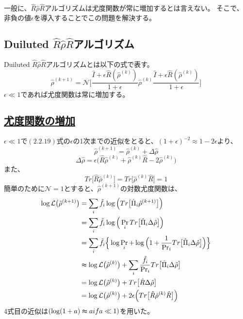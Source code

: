 \documentclass[11pt,a4j,notitlepage]{jreport}
\begin{document}
	一般に、$\hat{R} \hat{\rho} \hat{R}$アルゴリズムは尤度関数が常に増加するとは言えない。
	そこで、非負の値$\epsilon$を導入することでこの問題を解決する。

	\subsection{Duiluted $\hat{R} \hat{\rho} \hat{R}$アルゴリズム}

	Duiluted $\hat{R} \hat{\rho} \hat{R}$アルゴリズムとは以下の式で表す。
	\begin{equation}
		\hat{\rho}^{(k+1)} = \mathcal{N} \Bigg[ \frac{\hat{I} + \epsilon \hat{R} (\hat{\rho}^{(k)})}{1+\epsilon} \hat{\rho}^{(k)} \frac{\hat{I} + \epsilon \hat{R} (\hat{\rho}^{(k)})}{1+\epsilon} \Bigg]
	\end{equation}
	$\epsilon \ll 1$であれば尤度関数は常に増加する。

	\subsection*{\underline{尤度関数の増加}}

	$\epsilon \ll 1$で$(2.2.19)$式の$\epsilon$の1次までの近似をとると、$(1 + \epsilon)^{-2} \approx 1 - 2\epsilon$より、
	\begin{equation}
		\hat{\rho}^{(k+1)} = \hat{\rho}^{(k)} + \Delta \hat{\rho}
	\end{equation}
	\begin{equation}
		\Delta \hat{\rho} = \epsilon \big( \hat{R} \hat{\rho}^{(k)} + \hat{\rho}^{(k)} \hat{R} -2 \hat{\rho}^{(k)} \big)
	\end{equation}
	また、
	\begin{equation}
		Tr \big[ \hat{R} \hat{\rho}^{(k)} \big] = Tr \big[ \hat{\rho}^{(k)} \hat{R} \big] = 1 
	\end{equation}
	簡単のために$\mathcal{N} = 1$とすると、$\hat{\rho}^{(k+1)}$の対数尤度関数は、
	\begin{equation}
		\begin{aligned}
			\log \mathcal{L} \big( \hat{\rho}^{(k+1)} \big) &= \sum_i \tilde{f}_i \log \Big( Tr \big[ \hat{\Pi}_i \hat{\rho}^{(k+1)} \big] \Big) \\
			&= \sum_i \tilde{f}_i \log \Big( \Pr_i Tr \big[ \hat{\Pi}_i \Delta \hat{\rho} \big] \Big) \\
			&= \sum_i \tilde{f}_i \Big\{ \log \Pr_i + \log \Big( 1 + \frac{1}{\Pr_i} Tr \big[ \hat{\Pi}_i \Delta \hat{\rho} \big] \Big) \Big\} \\
			&\thickapprox \log \mathcal{L} \big( \hat{\rho}^{(k)} \big) + \sum_i \frac{\tilde{f}_i}{\Pr_i} Tr \big[ \hat{\Pi}_i \Delta \hat{\rho} \big] \\
			&= \log \mathcal{L} \big( \hat{\rho}^{(k)} \big) + Tr \big[ \hat{R} \Delta \hat{\rho} \big] \\
			&= \log \mathcal{L} \big( \hat{\rho}^{(k)} \big) + 2 \epsilon \Big( Tr \big[ \hat{R} \hat{\rho}^{(k)} \hat{R} \big] \Big)
		\end{aligned}
	\end{equation}
	4式目の近似は$( \log (1 + a) \thickapprox a if a \ll 1 )$を用いた。\\
\end{document}

